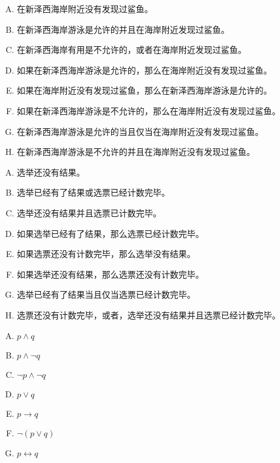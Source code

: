 {{        %
        \begin{practices}
            \begin{enumerate}[A.]
                \item 在新泽西海岸附近没有发现过鲨鱼。
                \item 在新泽西海岸游泳是允许的并且在海岸附近发现过鲨鱼。
                \item 在新泽西海岸有用是不允许的，或者在海岸附近发现过鲨鱼。
                \item 如果在新泽西海岸游泳是允许的，那么在海岸附近没有发现过鲨鱼。
                \item 如果在海岸附近没有发现过鲨鱼，那么在新泽西海岸游泳是允许的。
                \item 如果在新泽西海岸游泳是不允许的，那么在海岸附近没有发现过鲨鱼。
                \item 在新泽西海岸游泳是允许的当且仅当在海岸附近没有发现过鲨鱼。
                \item 在新泽西海岸游泳是不允许的并且在海岸附近没有发现过鲨鱼。
            \end{enumerate}
        \end{practices}

        \begin{practices}
            \begin{enumerate}[A.]
                \item 选举还没有结果。
                \item 选举已经有了结果或选票已经计数完毕。
                \item 选举还没有结果并且选票已计数完毕。
                \item 如果选举已经有了结果，那么选票已经计数完毕。
                \item 如果选票还没有计数完毕，那么选举没有结果。
                \item 如果选举还没有结果，那么选票还没有计数完毕。
                \item 选举已经有了结果当且仅当选票已经计数完毕。
                \item 选票还没有计数完毕，或者，选举还没有结果并且选票已经计数完毕。
            \end{enumerate}
        \end{practices}

        \begin{practices}
            \begin{enumerate}[A.]
                \item $p \wedge q$
                \item $p \wedge \neg q$
                \item $\neg p \wedge \neg q$
                \item $p \vee q$
                \item $p \rightarrow q$
                \item $\neg(p \vee q)$
                \item $p \leftrightarrow q$
            \end{enumerate}
        \end{practices}

}}
